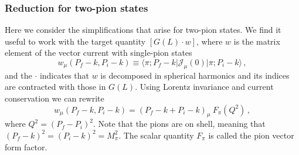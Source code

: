 {\mh [For $M_\pi L =4$, $\textbf P_i = 2 \pi \hat {\textbf z}/L$, $\textbf k = 2 \pi (1,1,0)/L$ calculate $\textbf k^*_i/M_\pi$ as a function of $E_i$.]}

\subsubsection{Reduction for two-pion states}


Here we consider the simplifications that arise for two-pion states. We find it useful to work with the target quantity $[G(L) \cdot w]$, where $w$ is the matrix element of the vector current with single-pion states 
\begin{equation}
w_\mu(P_f - k, P_i - k) \equiv
 \langle \pi; P_f - k \vert \mathcal J_\mu (0) \vert  \pi ; P_i - k \rangle \,, 
\end{equation}
and the $\cdot$ indicates that $w$ is decomposed in spherical harmonics and its indices are contracted with those in $G(L)$. Using Lorentz invariance and current conservation we can rewrite
\begin{equation}
w_\mu(P_f - k, P_i - k) 
  =  (P_f - k + P_i - k)_\mu \  F_\pi (Q^2) \,,
\end{equation}
where $Q^2 = (P_f - P_i)^2$. {} Note that the pions are on shell, meaning that $(P_f - k)^2 = (P_i - k)^2 = M_\pi^2$. The scalar quantity $F_\pi$ is called the pion vector form factor.

